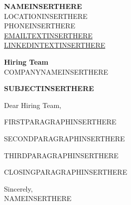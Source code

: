 \documentclass[11pt, a4paper]{article}
\begin{document}
\textbf{NAMEINSERTHERE}\\
LOCATIONINSERTHERE\\
PHONEINSERTHERE\\
\href{mailto:EMAILURLINSERTHERE}{EMAILTEXTINSERTHERE}\\
\href{LINKEDINURLINSERTHERE}{LINKEDINTEXTINSERTHERE}

\vspace{1cm}

\textbf{Hiring Team}\\
COMPANYNAMEINSERTHERE\\

\vspace{1cm}

\textbf{SUBJECTINSERTHERE}

Dear Hiring Team,

FIRSTPARAGRAPHINSERTHERE

SECONDPARAGRAPHINSERTHERE

THIRDPARAGRAPHINSERTHERE

CLOSINGPARAGRAPHINSERTHERE

Sincerely,\\
NAMEINSERTHERE
\end{document}
